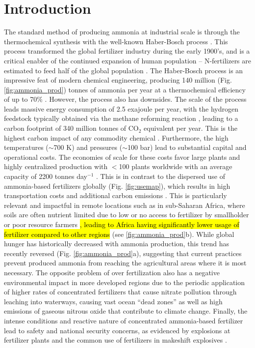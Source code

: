 \section{Introduction}

The standard method of producing ammonia at industrial scale is through the thermochemical synthesis with the well-known Haber-Bosch process \cite{Schloegl_2003}. This process transformed the global fertilizer industry during the early 1900's, and is a critical enabler of the continued expansion of human population \cite{Smil_1999} -- N-fertilizers are estimated to feed half of the global population \cite{Zhang_2015}. The Haber-Bosch process is an impressive feat of modern chemical engineering, producing 140 million (Fig. \ref{fig:ammonia_prod}) tonnes of ammonia per year at a thermochemical efficiency of up to 70\% \cite{Schloegl_2003,Schiffer_2017}. However, the process also has downsides. The scale of the process leads massive energy consumption of 2.5 exajoule per year, with the hydrogen feedstock typically obtained via the methane reforming reaction \cite{Abbas_2010}, leading to a carbon footprint of 340 million tonnes of CO$_2$ equivalent per year. This is the highest carbon impact of any commodity chemical \cite{Schiffer_2017}. Furthermore, the high temperatures ($\sim$700 K) and pressures ($\sim$100 bar) lead to substantial capital and operational costs. The economies of scale for these costs favor large plants and highly centralized production with $<$100 plants worldwide with an average capacity of 2200 tonnes day$^{-1}$ \cite{McArthur_2017, Bartels}. This is in contrast to the dispersed use of ammonia-based fertilizers globally (Fig. \ref{fig:usemap}), which results in high transportation costs and additional carbon emissions \cite{West_2002}. This is particularly relevant and impactful in remote locations such as in sub-Saharan Africa, where soils are often nutrient limited due to low or no access to fertilizer by smallholder or poor resource farmers \cite{Gilbert_2012, Mueller_2012, VanderVelde2014}\hl{, leading to Africa having significantly lower usage of fertilizer compared to other regions} (see \ref{fig:ammonia_prod}b). While global hunger has historically decreased with ammonia production, this trend has recently reversed (Fig. \ref{fig:ammonia_prod}a), suggesting that current practices prevent produced ammonia from reaching the agricultural areas where it is most necessary. The opposite problem of over fertilization also has a negative environmental impact in more developed regions due to the periodic application of higher rates of concentrated fertilizers that cause nitrate pollution through leaching into waterways, causing vast ocean ``dead zones'' \cite{Diaz2008, Stevens_2019} as well as high emissions of gaseous nitrous oxide that contribute to climate change. Finally, the intense conditions and reactive nature of concentrated ammonia-based fertilizer lead to safety and national security concerns, as evidenced by explosions at fertilizer plants and the common use of fertilizers in makeshift explosives \cite{Marlair_2005}.

